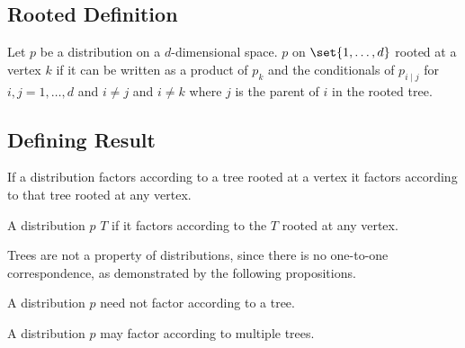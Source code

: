 


\subsection{Rooted Definition}

Let $p$ be a distribution on
a $d$-dimensional space.
$p$
on $\set{1, \dots, d}$ rooted
at a vertex $k$ if it can be
written as a product of $p_k$
and the conditionals of $p_{i \mid j}$
for $i,j = 1, \dots, d$ and $i \neq j$
and $i \neq k$ where $j$ is the parent
of $i$ in the rooted tree.

\subsection{Defining Result}
\begin{prop}
If a distribution factors according
to a tree rooted at a vertex it
factors according to that tree rooted
at any vertex.
\end{prop}


A distribution $p$
 $T$
if it factors according to the
$T$ rooted at any vertex.


Trees are not a property of distributions,
since there is no one-to-one correspondence,
as demonstrated by the following propositions.


A distribution $p$ need not factor according to a tree.

A distribution
$p$ may factor according to multiple trees.
